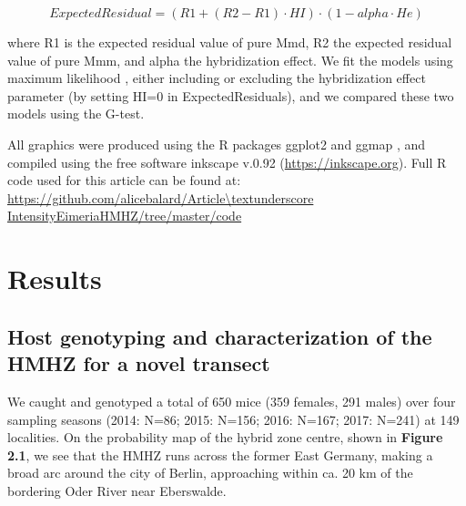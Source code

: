 \begin{equation}
ExpectedResidual=(R1 + (R2 − R1) · HI) · (1 − alpha · He)
\end{equation}

where R1 is the expected residual value of pure Mmd, R2 the expected residual value of pure Mmm, and alpha the hybridization effect. We fit the models using maximum likelihood \parencite[using the R package mle2;][]{bolker_bbmle_2017}, either including or excluding the hybridization effect parameter (by setting HI=0 in ExpectedResiduals), and we compared these two models using the G-test. 
\par All graphics were produced using the R packages ggplot2 \citep{wickham_ggplot2_2016} and ggmap \citep{kahle_ggmap_2013}, and compiled using the free software inkscape v.0.92 (\url{https://inkscape.org}). Full R code used for this article can be found at:	 \url{https://github.com/alicebalard/Article\textunderscore IntensityEimeriaHMHZ/tree/master/code}

\section{Results}
\subsection{Host genotyping and characterization of the HMHZ for a novel transect}
We caught and genotyped a total of 650 mice (359 females, 291 males) over four sampling seasons (2014: N=86; 2015: N=156; 2016: N=167; 2017: N=241) at 149 localities. On the probability map of the hybrid zone centre, shown in \textbf{Figure 2.1}, we see that the HMHZ runs across the former East Germany, making a broad arc around the city of Berlin, approaching within ca. 20 km of the bordering Oder River near Eberswalde. 

